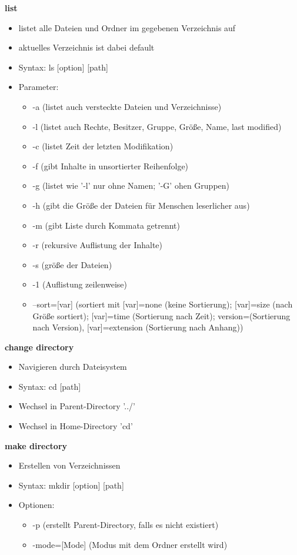 \documentclass[12pt,utf8, 10pt]{article}
\begin{document}
\textbf{list}
\begin{itemize}
	\item listet alle Dateien und Ordner im gegebenen Verzeichnis auf
	\item aktuelles Verzeichnis ist dabei default
	\item Syntax: ls [option] [path]
	\item Parameter:
	\begin{itemize}
		\item -a (listet auch versteckte Dateien und Verzeichnisse)
		\item -l (listet auch Rechte, Besitzer, Gruppe, Größe, Name, last modified)
		\item -c (listet Zeit der letzten Modifikation)
		\item -f (gibt Inhalte in unsortierter Reihenfolge)
		\item -g (listet wie '-l' nur ohne Namen; '-G' ohen Gruppen)
		\item -h (gibt die Größe der Dateien für Menschen leserlicher aus)
		\item -m (gibt Liste durch Kommata getrennt)
		\item -r (rekursive Auflistung der Inhalte)
		\item -s (größe der Dateien)
		\item -1 (Auflistung zeilenweise)
		\item --sort=[var] (sortiert mit [var]=none (keine Sortierung); [var]=size (nach Größe sortiert); [var]=time (Sortierung nach Zeit); version=(Sortierung nach Version), [var]=extension (Sortierung nach Anhang))
	\end{itemize}
\end{itemize}

\textbf{change directory}
\begin{itemize}
	\item Navigieren durch Dateisystem
	\item Syntax: cd [path]
	\item Wechsel in Parent-Directory '../'
	\item Wechsel in Home-Directory 'cd' 
\end{itemize}

\textbf{make directory}
\begin{itemize}
	\item Erstellen von Verzeichnissen
	\item Syntax: mkdir [option] [path]
	\item Optionen:
	\begin{itemize}
		\item -p (erstellt Parent-Directory, falls es nicht existiert)
		\item -mode=[Mode] (Modus mit dem Ordner erstellt wird)
	\end{itemize}
\end{itemize}
\end{document}
